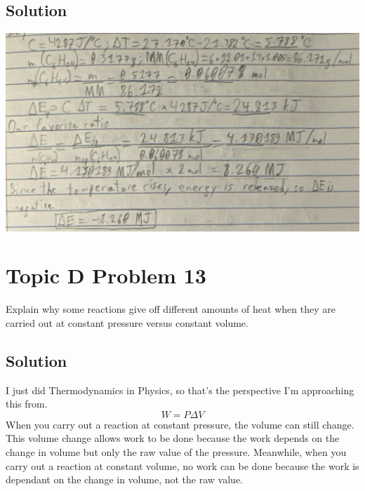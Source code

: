\documentclass[10pt]{article}
\begin{document}
        \subsection{Solution}
            \begin{center}
                \includegraphics[width=\textwidth]{Answers Images/Problem 12.jpg}
            \end{center}

    \pagebreak
    \section{Topic D Problem 13}
        Explain why some reactions give off different amounts of heat when they are carried out at constant pressure versus constant volume.
        
        \subsection{Solution}
            I just did Thermodynamics in Physics, so that's the perspective I'm approaching this from.
            \begin{equation}
                W   =   P \Delta V
            \end{equation}
            When you carry out a reaction at constant pressure, the volume can still change. 
            This volume change allows work to be done because the work depends on the change in volume but only the raw value of the pressure.
            Meanwhile, when you carry out a reaction at constant volume, no work can be done because the work is dependant on the change in volume, not the raw value. 

    \pagebreak
\end{document}
